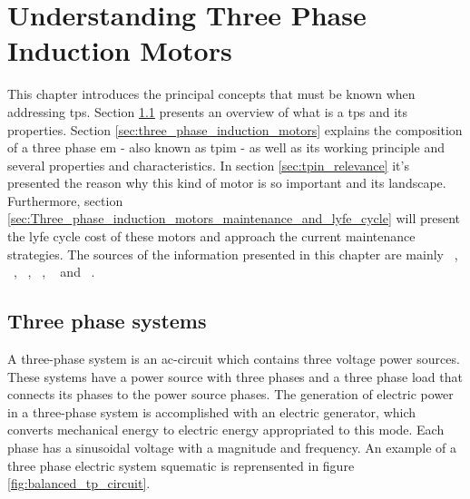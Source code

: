 \chapter{Understanding Three Phase Induction Motors}
\label{cha:intro_electric_motors}



This chapter introduces the principal concepts that must be known when addressing \acrfull{tps}. Section \ref{sec:three_phase_systems} presents an overview of what is a \acrshort{tps} and its properties. Section \ref{sec:three_phase_induction_motors} explains the composition of a three phase \acrfull{em} - also known as \acrfull{tpim} - as well as its working principle and several properties and characteristics. In section \ref{sec:tpin_relevance} it's presented the reason why this kind of motor is so important and its landscape. Furthermore, section \ref{sec:Three_phase_induction_motors_maintenance_and_lyfe_cycle} will present the lyfe cycle cost of these motors and approach the current maintenance strategies. The sources of the information presented in this chapter are mainly ~\cite{Helfenstein2000}, ~\cite{Alves2003}, ~\cite{Fitzgerald1985}, ~\cite{Guru2001}, ~\cite{Rashid2011} and ~\cite{Ferreira1}.

\section{Three phase systems} %
\label{sec:three_phase_systems}

A three-phase system is an \acrshort{ac}-circuit which contains three voltage power sources. These systems have a power source with three phases and a three phase load that connects its phases to the power source phases. The generation of electric power in a three-phase system is accomplished with an electric generator, which converts mechanical energy to electric energy appropriated to this mode. Each phase has a sinusoidal voltage with a magnitude and frequency. An example of a three phase electric system squematic is reprensented in figure \ref{fig:balanced_tp_circuit}.

